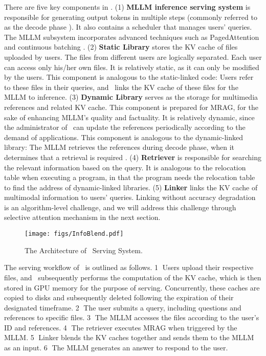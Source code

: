 There are five key components in \sys. (1) \textbf{MLLM inference serving system} is responsible for generating output tokens in multiple steps (commonly referred to as the decode phase \cite{zhong2024}). It also contains a scheduler that manages users' queries. The MLLM subsystem incorporates advanced techniques such as PagedAttention \cite{kwon2023efficient} and continuous batching \cite{yu2022}. (2) \textbf{Static Library} stores the KV cache of files uploaded by users. The files from different users are logically separated. Each user can access only his/her own files. It is relatively static, as it can only be modified by the users. This component is analogous to the static-linked code: Users refer to these files in their queries, and \sys~links the KV cache of these files for the MLLM to inference. (3) \textbf{Dynamic Library} serves as the storage for multimedia references and related KV cache. This component is prepared for MRAG, for the sake of enhancing MLLM's quality and factuality. It is relatively dynamic, since the administrator of \sys~can update the references periodically according to the demand of applications. This component is analogous to the dynamic-linked library: The MLLM retrieves the references during decode phase, when it determines that a retrieval is required \cite{asai2023selfrag, jeong2024adaptive}. (4) \textbf{Retriever} is responsible for searching the relevant information based on the query. It is analogous to the relocation table when executing a program, in that the program needs the relocation table to find the address of dynamic-linked libraries. (5) \textbf{Linker} links the KV cache of multimodal information to users' queries. Linking without accuracy degradation is an algorithm-level challenge, and we will address this challenge through selective attention mechanism in the next section.
\begin{figure}
    \centering
    \texttt{[image: figs/InfoBlend.pdf]}
    \caption{The Architecture of \sys~Serving System.}
    \label{fig:infoblend}
\end{figure}

The serving workflow of \sys~is outlined as follows. \textcircled{1} Users upload their respective files, and \sys~subsequently performs the computation of the KV cache, which is then stored in GPU memory for the purpose of serving. Concurrently, these caches are copied to disks and subsequently deleted following the expiration of their designated timeframe. \textcircled{2} The user submits a query, including questions and references to specific files. \textcircled{3} The MLLM accesses the files according to the user's ID and references. \textcircled{4} The retriever executes MRAG when triggered by the MLLM. \textcircled{5} Linker blends the KV caches together and sends them to the MLLM as an input. \textcircled{6} The MLLM generates an answer to respond to the user.

